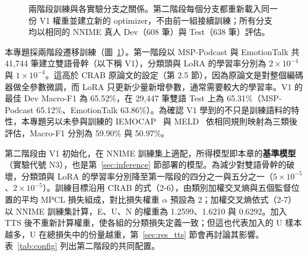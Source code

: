 \begin{figure}[t]
\centering
{%
}
\caption{兩階段訓練與各實驗分支之關係。第二階段每個分支都重新載入同一份 V1 權重並建立新的 optimizer，不由前一組接續訓練；所有分支均以相同的 NNIME 真人 Dev（608 筆）與 Test（638 筆）評估。}
\label{fig:pipeline}
\end{figure}

本專題採兩階段遷移訓練（圖~\ref{fig:pipeline}）。第一階段以 MSP-Podcast 與 EmotionTalk 共 41,744 筆建立雙語骨幹（以下稱 V1），分類頭與 LoRA 的學習率分別為 $2\times10^{-4}$ 與 $1\times10^{-4}$。這高於 CRAB 原論文的設定（第 2.5 節），因為原論文是對整個編碼器做全參數微調，而 LoRA 只更新少量新增參數，通常需要較大的學習率。V1 的最佳 Dev Macro-F1 為 65.52\%，在 29,447 筆雙語 Test 上為 65.31\%（MSP-Podcast 65.12\%、EmotionTalk 63.86\%）。為確認 V1 學到的不只是訓練語料的特性，本專題另以未參與訓練的 IEMOCAP~\cite{iemocap} 與 MELD~\cite{meld} 依相同規則映射為三類後評估，Macro-F1 分別為 59.90\% 與 50.97\%。

第二階段由 V1 初始化，在 NNIME 訓練集上適配，所得模型即本章的\textbf{基準模型}（實驗代號 N3），也是第~\ref{sec:inference} 節部署的模型。為減少對雙語骨幹的破壞，分類頭與 LoRA 的學習率分別降至第一階段的四分之一與五分之一（$5\times10^{-5}$、$2\times10^{-5}$）。訓練目標沿用 CRAB 的式（2-6），由類別加權交叉熵與五個監督位置的平均 MPCL 損失組成，對比損失權重 $\alpha$ 預設為 2；加權交叉熵依式（2-7）以 NNIME 訓練集計算，E、U、N 的權重為 1.2599、1.6210 與 0.6292。加入 TTS 後不重新計算權重，使各組的分類損失定義一致；但這也代表加入的 U 樣本越多，U 在總損失中的份量越重，第~\ref{sec:res_tts} 節會再討論其影響。表~\ref{tab:config} 列出第二階段的共同配置。

